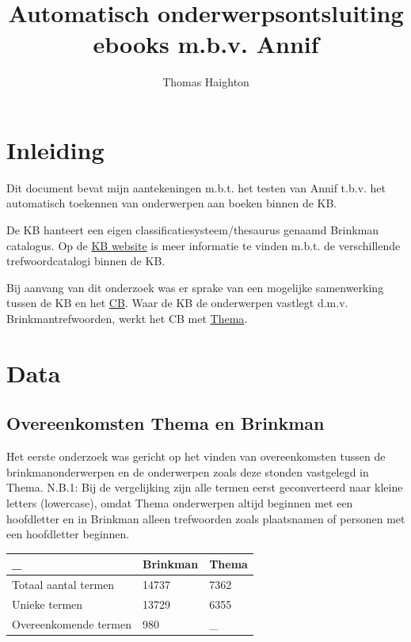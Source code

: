 \documentclass{article}
\title{Automatisch onderwerpsontsluiting ebooks m.b.v. Annif}
\author{Thomas Haighton}
\begin{document}
\maketitle

\clearpage

\tableofcontents

\clearpage

\section{Inleiding}
Dit document bevat mijn aantekeningen m.b.t. het testen van Annif t.b.v. het automatisch toekennen van onderwerpen aan boeken binnen de KB. 

De KB hanteert een eigen classificatiesysteem/thesaurus genaamd Brinkman catalogus. Op de \href{https://www.kb.nl/bronnen-zoekwijzers/zoekwijzers/meer-informatie-over-zoeken/trefwoorden-in-de-kb-catalogus}{KB website} is meer informatie te vinden m.b.t. de verschillende trefwoordcatalogi binnen de KB.

Bij aanvang van dit onderzoek was er sprake van een mogelijke samenwerking tussen de KB en het \href{https://www.cb.nl}{CB}. Waar de KB de onderwerpen vastlegt d.m.v. Brinkmantrefwoorden, werkt het CB met \href{https://www.editeur.org/151/Thema/}{Thema}.

\section{Data}

\subsection{Overeenkomsten Thema en Brinkman}

Het eerste onderzoek was gericht op het vinden van overeenkomsten tussen de brinkmanonderwerpen en de onderwerpen zoals deze stonden vastgelegd in Thema.
N.B.1: Bij de vergelijking zijn alle termen eerst geconverteerd naar kleine letters (lowercase), omdat Thema onderwerpen altijd beginnen met een hoofdletter en in Brinkman alleen trefwoorden zoals plaatsnamen of personen met een hoofdletter beginnen.
\\

\begin{tabular}{|l|l|l|}
\hline
\_                    & Brinkman  & Thema \\
\hline
Totaal aantal termen  & 14737     & 7362 \\
Unieke termen         & 13729     & 6355 \\
Overeenkomende termen & 980       & \_   \\
\hline
\end{tabular}
\end{document}

